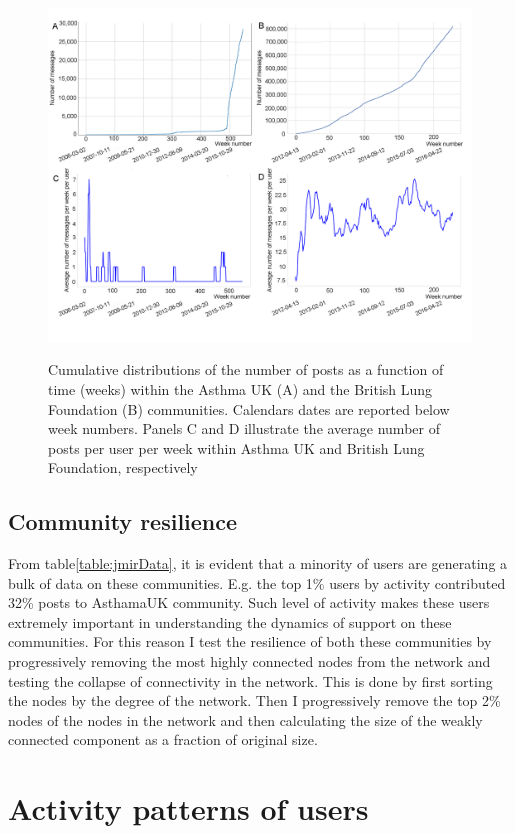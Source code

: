 \begin{figure}[!ht]
    \centering
    \includegraphics[width=\textwidth ]{Activity.png}
    \label{fig:activity}
    \caption{Cumulative distributions of the number of posts as a function of time (weeks) within the Asthma UK (A) and the British Lung Foundation (B) communities. Calendars dates are reported below week numbers. Panels C and D illustrate the average number of posts per user per week within Asthma UK and British Lung Foundation, respectively}
\end{figure}

\subsection{Community resilience}
From table\ref{table:jmirData}, it is evident that a minority of users are generating a bulk of data on these communities. E.g. the top 1\% users by activity contributed 32\% posts to AsthamaUK community. Such level of activity makes these users extremely important in understanding the dynamics of support on these communities. For this reason I test the resilience of both these communities by progressively removing the most highly connected nodes from the network and testing the collapse of connectivity in the network. This is done by first sorting the nodes by the degree of the network. Then I progressively remove the top 2\% nodes of the nodes in the network and then calculating the size of the weakly connected component as a fraction of original size. 

\section{Activity patterns of users}


